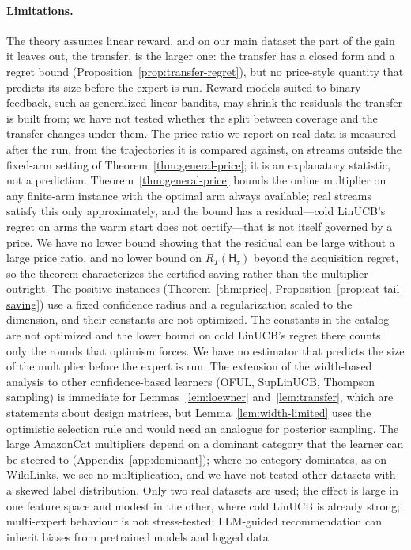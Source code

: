 \documentclass{article}
\theoremstyle{definition}
\theoremstyle{remark}
\theoremstyle{remark}
\newcommand{\Hyb}{\mathsf{H}}
\begin{document}
\paragraph{Limitations.}
The theory assumes linear reward, and on our main dataset the part of the
gain it leaves out, the transfer, is the larger one: the transfer has a closed form and a regret bound
(Proposition~\ref{prop:transfer-regret}), but no price-style quantity that
predicts its size before the expert is run. Reward models suited to binary
feedback, such as generalized linear bandits, may shrink the residuals the
transfer is built from; we have not tested whether the split between coverage
and the transfer changes under them. The price ratio we report on real data is measured after
the run, from the trajectories it is compared against, on streams outside the
fixed-arm setting of Theorem~\ref{thm:general-price}; it is an explanatory
statistic, not a prediction. Theorem~\ref{thm:general-price} bounds the
online multiplier on any finite-arm instance with the optimal arm always
available; real streams satisfy this only approximately, and the bound has a
residual---cold LinUCB's regret on arms the warm start does not certify---that
is not itself governed by a price. We have no lower bound showing that the
residual can be large without a large price ratio, and no lower bound on
$R_T(\Hyb_\tau)$ beyond the acquisition regret, so the theorem characterizes
the certified saving rather than the multiplier outright. The positive
instances (Theorem~\ref{thm:price}, Proposition~\ref{prop:cat-tail-saving})
use a fixed confidence radius and a regularization scaled to the dimension,
and their constants are not optimized.
The constants in the catalog are not optimized and the lower bound on cold
LinUCB's regret there counts only the rounds that optimism forces. We have
no estimator that predicts the size of the multiplier before the expert is
run. The extension of the width-based analysis to other
confidence-based learners (OFUL, SupLinUCB, Thompson sampling) is immediate
for Lemmas~\ref{lem:loewner} and~\ref{lem:transfer}, which are statements
about design matrices, but Lemma~\ref{lem:width-limited} uses the optimistic
selection rule and would need an analogue for posterior sampling. The large
AmazonCat multipliers depend on a dominant category that the learner can be
steered to (Appendix~\ref{app:dominant}); where no category dominates, as on
WikiLinks, we see no multiplication, and we have not tested other datasets
with a skewed label distribution. Only two
real datasets are used; the effect is large in one feature space and modest in
the other, where cold LinUCB is already strong; multi-expert behaviour is not
stress-tested;
LLM-guided recommendation can inherit biases from pretrained models and
logged data.
\end{document}
